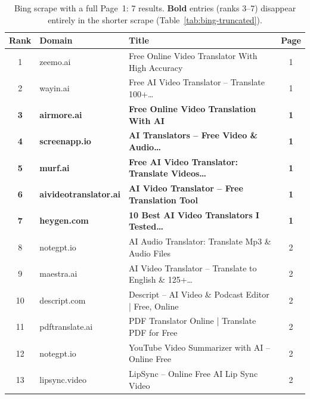 \begin{table}[htbp]
\centering
\caption{Bing scrape with a full Page~1: 7 results. \textbf{Bold} entries (ranks 3--7) disappear entirely in the shorter scrape (Table~\ref{tab:bing-truncated}).}
\label{tab:bing-full}
\small
\begin{tabular}{@{}clp{6.5cm}c@{}}
\toprule
\textbf{Rank} & \textbf{Domain} & \textbf{Title} & \textbf{Page} \\
\midrule
1 & zeemo.ai & Free Online Video Translator With High Accuracy & 1 \\
2 & wayin.ai & Free AI Video Translator -- Translate 100+\ldots & 1 \\
\textbf{3} & \textbf{airmore.ai} & \textbf{Free Online Video Translation With AI} & \textbf{1} \\
\textbf{4} & \textbf{screenapp.io} & \textbf{AI Translators -- Free Video \& Audio\ldots} & \textbf{1} \\
\textbf{5} & \textbf{murf.ai} & \textbf{Free AI Video Translator: Translate Videos\ldots} & \textbf{1} \\
\textbf{6} & \textbf{aivideotranslator.ai} & \textbf{AI Video Translator -- Free Translation Tool} & \textbf{1} \\
\textbf{7} & \textbf{heygen.com} & \textbf{10 Best AI Video Translators I Tested\ldots} & \textbf{1} \\
\midrule
8 & notegpt.io & AI Audio Translator: Translate Mp3 \& Audio Files & 2 \\
9 & maestra.ai & AI Video Translator -- Translate to English \& 125+\ldots & 2 \\
10 & descript.com & Descript -- AI Video \& Podcast Editor | Free, Online & 2 \\
11 & pdftranslate.ai & PDF Translator Online | Translate PDF for Free & 2 \\
12 & notegpt.io & YouTube Video Summarizer with AI -- Online Free & 2 \\
13 & lipsync.video & LipSync -- Online Free AI Lip Sync Video & 2 \\
\bottomrule
\end{tabular}
\end{table}

